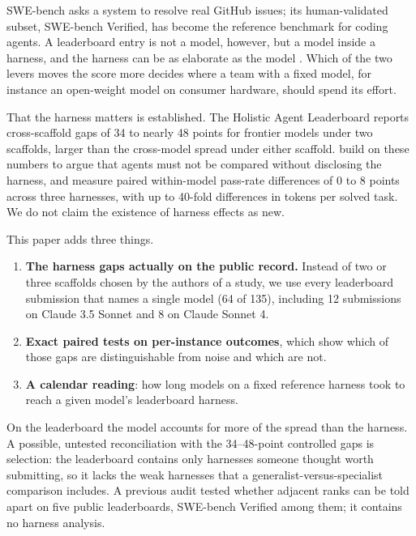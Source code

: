 \documentclass[10pt]{article}
\begin{document}
SWE-bench \citep{jimenez2024swebench} asks a system to resolve real GitHub issues; its human-validated subset, SWE-bench Verified, has become the reference benchmark for coding agents. A leaderboard entry is not a model, however, but a model inside a harness, and the harness can be as elaborate as the model \citep{yang2024sweagent}. Which of the two levers moves the score more decides where a team with a fixed model, for instance an open-weight model on consumer hardware, should spend its effort.

That the harness matters is established. The Holistic Agent Leaderboard \citep{kapoor2025hal} reports cross-scaffold gaps of 34 to nearly 48 points for frontier models under two scaffolds, larger than the cross-model spread under either scaffold. \citet{zhang2026harness} build on these numbers to argue that agents must not be compared without disclosing the harness, and \citet{vats2026scaffold} measure paired within-model pass-rate differences of 0 to 8 points across three harnesses, with up to 40-fold differences in tokens per solved task. We do not claim the existence of harness effects as new.

This paper adds three things.
\begin{enumerate}
\item \textbf{The harness gaps actually on the public record.} Instead of two or three scaffolds chosen by the authors of a study, we use every leaderboard submission that names a single model (64 of 135), including 12 submissions on Claude 3.5 Sonnet and 8 on Claude Sonnet 4.
\item \textbf{Exact paired tests on per-instance outcomes}, which show which of those gaps are distinguishable from noise and which are not.
\item \textbf{A calendar reading}: how long models on a fixed reference harness took to reach a given model's leaderboard harness.
\end{enumerate}

On the leaderboard the model accounts for more of the spread than the harness. A possible, untested reconciliation with the 34--48-point controlled gaps is selection: the leaderboard contains only harnesses someone thought worth submitting, so it lacks the weak harnesses that a generalist-versus-specialist comparison includes. A previous audit \citep{vaatainen2026resolution} tested whether adjacent ranks can be told apart on five public leaderboards, SWE-bench Verified among them; it contains no harness analysis.
\end{document}
